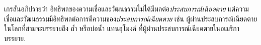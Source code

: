 {\begin{shaded}
		
		
		
		
		
		
		
		
		
		เกรสันอภิปรายว่า อิทธิพลของความเชื่อและวัฒนธรรมไม่ได้มีผลต่อ\textit{ประสบการณ์เฉียดตาย} 
		แต่ความเชื่อและวัฒนธรรมมีอิทธิพลต่อการตีความของ\textit{ประสบการณ์เฉียดตาย}
		เช่น ผู้ผ่านประสบการณ์เฉียดตายในโลกที่สามจะบรรยายถึง ถ้ำ หรือบ่อน้ำ แทนอุโมงค์ ที่ผู้ผ่านประสบการณ์เฉียดตายในอเมริกาบรรยาย.
		
		
		
		
		
		

\end{shaded}}
